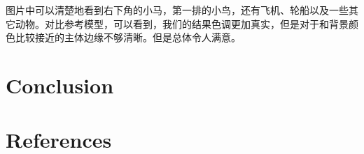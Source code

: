 \documentclass{ctexart}
\begin{document}
\noindent
图片中可以清楚地看到右下角的小马，第一排的小鸟，还有飞机、轮船以及一些其它动物。对比参考模型，可以看到，我们的结果色调更加真实，但是对于和背景颜色比较接近的主体边缘不够清晰。但是总体令人满意。

\section{Conclusion}


\section{References}

    
\end{document}
